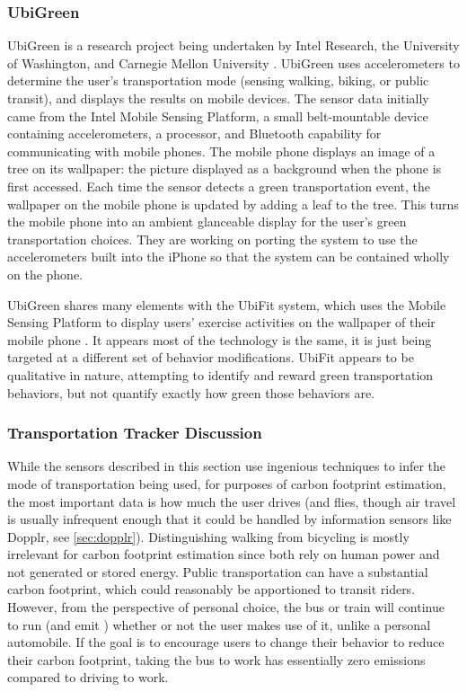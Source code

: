 \subsubsection{UbiGreen}
\label{ubigreen}

UbiGreen is a research project being undertaken by Intel Research, the University of Washington, and Carnegie Mellon University \cite{ubigreen-website}. UbiGreen uses accelerometers to determine the user's transportation mode (sensing walking, biking, or public transit), and displays the results on mobile devices. The sensor data initially came from the Intel Mobile Sensing Platform, a small belt-mountable device containing accelerometers, a processor, and Bluetooth capability for communicating with mobile phones. The mobile phone displays an image of a tree on its wallpaper: the picture displayed as a background when the phone is first accessed. Each time the sensor detects a green transportation event, the wallpaper on the mobile phone is updated by adding a leaf to the tree. This turns the mobile phone into an ambient glanceable display for the user's green transportation choices. They are working on porting the system to use the accelerometers built into the iPhone so that the system can be contained wholly on the phone.

UbiGreen shares many elements with the UbiFit system, which uses the Mobile Sensing Platform to display users' exercise activities on the wallpaper of their mobile phone \cite{Consolvo2008Flowers-or-robot}. It appears most of the technology is the same, it is just being targeted at a different set of behavior modifications. UbiFit appears to be qualitative in nature, attempting to identify and reward green transportation behaviors, but not quantify exactly how green those behaviors are.

\subsubsection{Transportation Tracker Discussion}

While the sensors described in this section use ingenious techniques to infer the mode of transportation being used, for purposes of carbon footprint estimation, the most important data is how much the user drives (and flies, though air travel is usually infrequent enough that it could be handled by information sensors like Dopplr, see \autoref{sec:dopplr}). Distinguishing walking from bicycling is mostly irrelevant for carbon footprint estimation since both rely on human power and not generated or stored energy. Public transportation can have a substantial carbon footprint, which could reasonably be apportioned to transit riders. However, from the perspective of personal choice, the bus or train will continue to run (and emit \COtwo) whether or not the user makes use of it, unlike a personal automobile. If the goal is to encourage users to change their behavior to reduce their carbon footprint, taking the bus to work has essentially zero emissions compared to driving to work.

